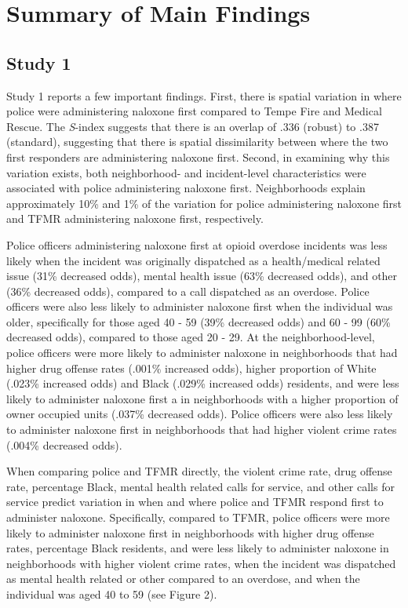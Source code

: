 \section{\centering Summary of Main Findings}
\subsection{Study 1}
Study 1 reports a few important findings. First, there is spatial variation in where police were administering naloxone first compared to Tempe Fire and Medical Rescue. The \textit{S}-index suggests that there is an overlap of .336 (robust) to .387 (standard), suggesting that there is spatial dissimilarity between where the two first responders are administering naloxone first. Second, in examining why this variation exists, both neighborhood- and incident-level characteristics were associated with police administering naloxone first. Neighborhoods explain approximately 10\% and 1\% of the variation for police administering naloxone first and TFMR administering naloxone first, respectively. 

Police officers administering naloxone first at opioid overdose incidents was less likely when the incident was originally dispatched as a health/medical related issue (31\% decreased odds), mental health issue (63\% decreased odds), and other (36\% decreased odds), compared to a call dispatched as an overdose. Police officers were also less likely to administer naloxone first when the individual was older, specifically for those aged 40 - 59 (39\% decreased odds) and 60 - 99 (60\% decreased odds), compared to those aged 20 - 29. At the neighborhood-level, police officers were more likely to administer naloxone in neighborhoods that had higher drug offense rates (.001\% increased odds), higher proportion of White (.023\% increased odds) and Black (.029\% increased odds) residents, and were less likely to administer naloxone first a in neighborhoods with a higher proportion of owner occupied units (.037\% decreased odds). Police officers were also less likely to administer naloxone first in neighborhoods that had higher violent crime rates (.004\% decreased odds).

When comparing police and TFMR directly, the violent crime rate, drug offense rate, percentage Black, mental health related calls for service, and other calls for service predict variation in when and where police and TFMR respond first to administer naloxone. Specifically, compared to TFMR, police officers were more likely to administer naloxone first in neighborhoods with higher drug offense rates, percentage Black residents, and were less likely to administer naloxone in neighborhoods with higher violent crime rates, when the incident was dispatched as mental health related or other compared to an overdose, and when the individual was aged 40 to 59 (see Figure 2).


